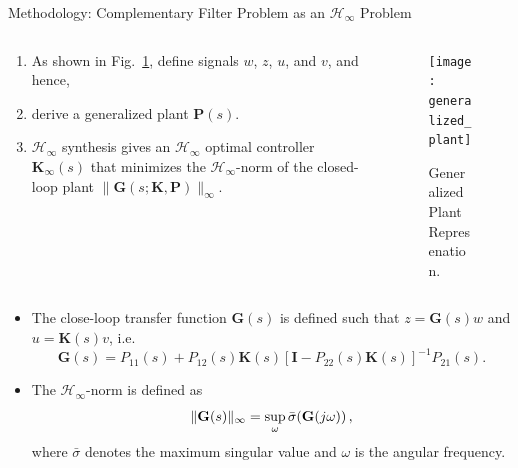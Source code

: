 \documentclass{beamer}
\begin{document}
\begin{frame}[t]
\begin{columns}[t]
\begin{column}{0.32\linewidth}
\begin{block}{Methodology: Complementary Filter Problem as an $\mathcal{H}_\infty$ Problem}
					\begin{columns}[t, onlytextwidth]
						\begin{column}{0.5\textwidth}
							\begin{enumerate}
								\item As shown in Fig.~\ref{fig:generalized_plant_representation}, define signals $w$, $z$, $u$, and $v$, and hence,
								\item derive a generalized plant $\mathbf{P}(s)$.
								\item $\mathcal{H}_\infty$ synthesis gives an $\mathcal{H}_\infty$ optimal controller $\mathbf{K}_\infty(s)$ that minimizes the $\mathcal{H}_\infty$-norm of the closed-loop plant $\lVert\mathbf{G}(s;\mathbf{K},\mathbf{P})\rVert_\infty$.
							\end{enumerate}
						\end{column}
						\begin{column}{0.5\textwidth}
							\begin{figure}
								\centering
								\texttt{[image: generalized\_plant]}
								\caption{Generalized Plant Represenation. }
								\label{fig:generalized_plant_representation}
							\end{figure}
						\end{column}
					\end{columns}
				
					\medskip
					
					\begin{itemize}
						\item The close-loop transfer function $\mathbf{G}(s)$ is defined such that $z=\mathbf{G}(s)w$ and $u=\mathbf{K}(s)v$, i.e.
						\begin{equation}
							\mathbf{G}(s) = P_{11}(s) + P_{12}(s)\mathbf{K}(s)\left[\mathbf{I}-P_{22}(s)\mathbf{K}(s)\right]^{-1}P_{21}(s).
						\end{equation}
						\item The $\mathcal{H}_\infty$-norm is defined as
						\begin{equation}
							\lVert \mathbf{G}(s) \rVert_\infty = \sup_\omega\bar\sigma \mleft(\mathbf{G}(j\omega)\mright)\,,
						\end{equation}
						where $\bar\sigma$ denotes the maximum singular value and $\omega$ is the angular frequency.
					\end{itemize}

					
		
			
			\end{block}
		\end{column}
		

\end{columns}
\end{frame}
\end{document}
